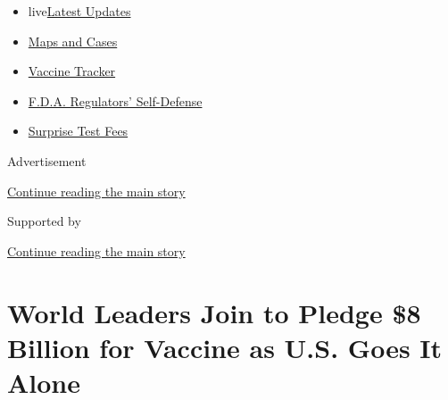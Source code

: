 \begin{itemize}
\tightlist
\item
  live\href{https://www.nytimes3xbfgragh.onion/2020/09/11/world/covid-19-coronavirus.html?name=styln-coronavirus-national\&region=TOP_BANNER\&block=storyline_menu_recirc\&action=click\&pgtype=Article\&impression_id=33999181-f4bd-11ea-bc0c-2dd0f27298e1\&variant=undefined}{Latest
  Updates}
\item
  \href{https://www.nytimes3xbfgragh.onion/interactive/2020/us/coronavirus-us-cases.html?name=styln-coronavirus-national\&region=TOP_BANNER\&block=storyline_menu_recirc\&action=click\&pgtype=Article\&impression_id=33999182-f4bd-11ea-bc0c-2dd0f27298e1\&variant=undefined}{Maps
  and Cases}
\item
  \href{https://www.nytimes3xbfgragh.onion/interactive/2020/science/coronavirus-vaccine-tracker.html?name=styln-coronavirus-national\&region=TOP_BANNER\&block=storyline_menu_recirc\&action=click\&pgtype=Article\&impression_id=33999183-f4bd-11ea-bc0c-2dd0f27298e1\&variant=undefined}{Vaccine
  Tracker}
\item
  \href{https://www.nytimes3xbfgragh.onion/2020/09/10/us/politics/fda-coronavirus-vaccine.html?name=styln-coronavirus-national\&region=TOP_BANNER\&block=storyline_menu_recirc\&action=click\&pgtype=Article\&impression_id=33999184-f4bd-11ea-bc0c-2dd0f27298e1\&variant=undefined}{F.D.A.
  Regulators' Self-Defense}
\item
  \href{https://www.nytimes3xbfgragh.onion/2020/09/09/upshot/coronavirus-surprise-test-fees.html?name=styln-coronavirus-national\&region=TOP_BANNER\&block=storyline_menu_recirc\&action=click\&pgtype=Article\&impression_id=3399b890-f4bd-11ea-bc0c-2dd0f27298e1\&variant=undefined}{Surprise
  Test Fees}
\end{itemize}

Advertisement

\protect\hyperlink{after-top}{Continue reading the main story}

Supported by

\protect\hyperlink{after-sponsor}{Continue reading the main story}

\hypertarget{world-leaders-join-to-pledge-8-billion-for-vaccine-as-us-goes-it-alone}{%
\section{World Leaders Join to Pledge \$8 Billion for Vaccine as U.S.
Goes It
Alone}\label{world-leaders-join-to-pledge-8-billion-for-vaccine-as-us-goes-it-alone}}

